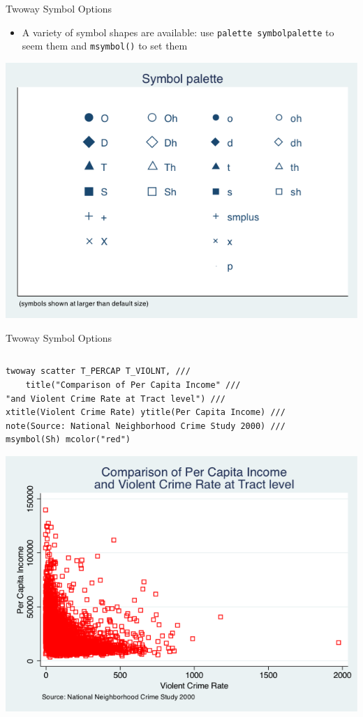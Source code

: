 \documentclass[table,smaller]{beamer}
\begin{document}
\begin{frame}[fragile,label=sec-3-5]{Twoway Symbol Options}
 \begin{itemize}
\item A variety of symbol shapes are available: use \texttt{palette symbolpalette} to seem them and \texttt{msymbol()} to set them
\end{itemize}
\includegraphics[width=.9\linewidth]{./images/Symbol.png}
\end{frame}
\begin{frame}[fragile,label=sec-3-6]{Twoway Symbol Options}
 \vspace{-.5em} \begin{columns}  \begin{block}{}
\begin{verbatim}
twoway scatter T_PERCAP T_VIOLNT, ///
    title("Comparison of Per Capita Income" ///
"and Violent Crime Rate at Tract level") ///
xtitle(Violent Crime Rate) ytitle(Per Capita Income) ///
note(Source: National Neighborhood Crime Study 2000) ///
msymbol(Sh) mcolor("red")
\end{verbatim}

\includegraphics[width=.9\linewidth]{./images/msymbol_mcolor.png}

\end{block} \end{columns}
\end{frame}
\end{document}

